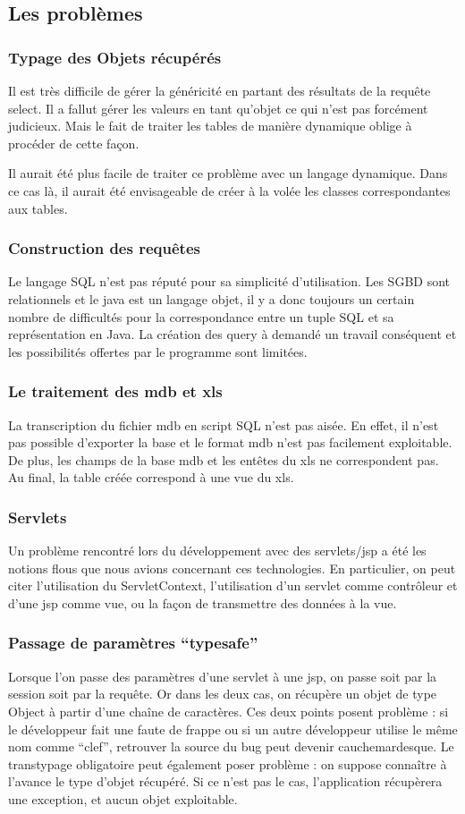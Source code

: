 \subsection{Les problèmes}
\subsubsection{Typage des Objets récupérés}
Il est très difficile de gérer la généricité en partant des résultats de la requête select. Il a fallut gérer les valeurs en tant qu'objet ce qui n'est pas forcément judicieux. Mais le fait de traiter les tables de manière dynamique oblige à procéder de cette façon. 

Il aurait été plus facile de traiter ce problème avec un langage dynamique. Dans ce cas là, il aurait été envisageable de créer à la volée les classes correspondantes aux tables.
\subsubsection{Construction des requêtes}
Le langage SQL n'est pas réputé pour sa simplicité d'utilisation. Les SGBD sont relationnels et le java est un langage objet, il y a donc toujours un certain nombre de difficultés pour la correspondance entre un tuple SQL et sa représentation en Java. La création des query à demandé un travail conséquent et les possibilités offertes par le programme sont limitées.
\subsubsection{Le traitement des mdb et xls}
La transcription du fichier mdb en script SQL n'est pas aisée. En effet, il n'est pas possible d'exporter la base et le format mdb n'est pas facilement exploitable. De plus, les champs de la base mdb et les entêtes du xls ne correspondent pas. Au final, la table créée correspond à une vue du xls.

\subsubsection{Servlets}
Un problème rencontré lors du développement avec des servlets/jsp a été les notions flous que nous avions concernant ces technologies. En particulier, on peut citer l'utilisation du ServletContext, l'utilisation d'un servlet comme contrôleur et d'une jsp comme vue, ou la façon de transmettre des données à la vue.

\subsubsection{Passage de paramètres ``typesafe''}
Lorsque l'on passe des paramètres d'une servlet à une jsp, on passe soit par la session soit par la requête. Or dans les deux cas, on récupère un objet de type Object à partir d'une chaîne de caractères. 
Ces deux points posent problème : si le développeur fait une faute de frappe ou si un autre développeur utilise le même nom comme ``clef'', retrouver la source du bug peut devenir cauchemardesque. 
Le transtypage obligatoire peut également poser problème : on suppose connaître à l'avance le type d'objet récupéré. Si ce n'est pas le cas, l'application récupèrera une exception, et aucun objet exploitable.
